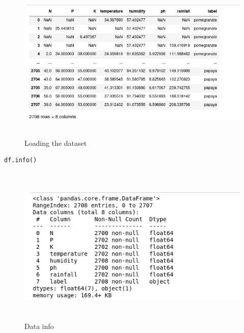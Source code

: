 \begin{figure}[ht]
    \centering
    \caption{Loading the dataset}
    \includegraphics[width=7in,height=3in]{data.jpg}
    
    \label{fig:data}
\end{figure}
\vspace{2\baselineskip}
\begin{lstlisting}[language=Python]
    df.info()
\end{lstlisting}
\begin{figure}[ht]
    \centering
    \includegraphics[width=5in,height=3in]{info.png}
    \caption{Data info}
    \label{fig:data}
\end{figure}


